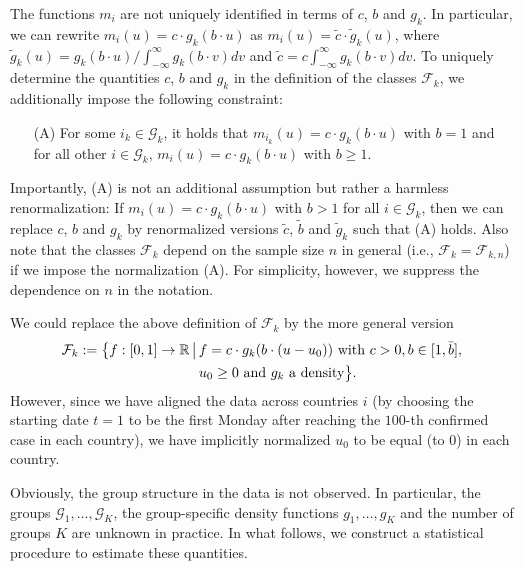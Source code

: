\documentclass[a4paper,12pt]{article}
\numberwithin{equation}{section}
\begin{document}
\begin{remark}
The functions $m_i$ are not uniquely identified in terms of $c$, $b$ and $g_k$. In particular, we can rewrite $m_i(u) = c \cdot g_k(b \cdot u)$ as $m_i(u) = \tilde{c} \cdot \tilde{g}_k(u)$, where $\tilde{g}_k(u) = g_k(b \cdot u) / \int_{-\infty}^\infty g_k(b \cdot v) dv$ and $\tilde{c} = c \int_{-\infty}^\infty g_k(b \cdot v) dv$. To uniquely determine the quantities $c$, $b$ and $g_k$ in the definition of the classes $\mathcal{F}_k$, we additionally impose the following constraint: 
\begin{itemize}[leftmargin=0.75cm]
\item[(A)] For some $i_k \in \mathcal{G}_k$, it holds that $m_{i_k}(u) = c \cdot g_k(b \cdot u)$ with $b = 1$ and for all other $i \in \mathcal{G}_k$, $m_i(u) = c \cdot g_k(b \cdot u)$ with $b \ge 1$. 
\end{itemize}
Importantly, (A) is not an additional assumption but rather a harmless renormalization: If $m_i(u) = c \cdot g_k(b \cdot u)$ with $b > 1$ for all $i \in \mathcal{G}_k$, then we can replace $c$, $b$ and $g_k$ by renormalized versions $\tilde{c}$, $\tilde{b}$ and $\tilde{g}_k$ such that (A) holds. Also note that the classes $\mathcal{F}_k$ depend on the sample size $n$ in general (i.e., $\mathcal{F}_k = \mathcal{F}_{k,n}$) if we impose the normalization (A). For simplicity, however, we suppress the dependence on $n$ in the notation. 
\end{remark}


\pagebreak
\begin{remark}\label{rem:classes_def}
We could replace the above definition of $\mathcal{F}_k$ by the more general version 
\begin{align*}
\mathcal{F}_k := \big\{ f:[0, 1] \rightarrow \mathbb{R} \,\big|\, & f = c \cdot g_k(b \cdot (u-u_0)) \text{ with } c>0, b \in [1, \bar{b}], \\ & u_0 \ge 0 \text{ and } g_k \text{ a density} \big\}. 
\end{align*}
However, since we have aligned the data across countries $i$ (by choosing the starting date $t=1$ to be the first Monday after reaching the $100$-th confirmed case in each country), we have implicitly normalized $u_0$ to be equal (to $0$) in each country. 
\end{remark}


Obviously, the group structure in the data is not observed. In particular, the groups $\mathcal{G}_1,\ldots,\mathcal{G}_K$, the group-specific density functions $g_1,\ldots,g_K$ and the number of groups $K$ are unknown in practice. In what follows, we construct a statistical procedure to estimate these quantities. 
\end{document}
